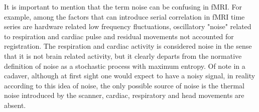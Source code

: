 \documentclass[10pt,letterpaper]{article}
\begin{document}
It is important to mention that the term noise can be confusing in fMRI. For example, among the factors that can introduce serial correlation in fMRI time series are hardware related low frequency fluctuations, oscillatory "noise" related to respiration and cardiac pulse and residual movements not accounted for registration. The respiration and cardiac activity is considered noise in the sense that it is not brain related activity, but it clearly departs from the normative definition of noise as a stochastic process with maximum entropy.
Of note in a cadaver, although at first sight one would expect to have a noisy signal, in reality according to this idea of noise, the only possible source of noise is the thermal noise introduced by the scanner, cardiac, respiratory and head movements are absent.

\end{document}
